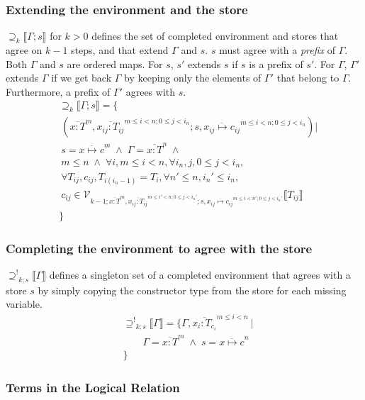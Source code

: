\documentclass[9pt]{sigplanconf}
\newcommand{\gap}{\quad\quad}
\newcommand{\seq}[1]{\overline{#1}}
\newcommand{\relv}[4]{\mathcal{V}_{#1;#2;#3}\llbracket#4\rrbracket}
\newcommand{\rels}[3]{\mathcal{\supseteq}_{#1}\llbracket#2;#3\rrbracket}
\newcommand{\relg}[3]{\mathcal{\supseteq^!}_{#1;#2}\llbracket#3\rrbracket}
\newcommand{\andl}{\;\wedge\;}
\begin{document}
\subsubsection{Extending the environment and the store}
$\rels k \Gamma s$ for $k > 0$ defines the set of completed
environment and stores that agree on $k-1$ steps, and that extend
$\Gamma$ and $s$. $s$ must agree with a {\it prefix} of $\Gamma$.
Both $\Gamma$ and $s$ are ordered maps. For $s$, $s'$ extends $s$ if
$s$ is a prefix of $s'$. For $\Gamma$, $\Gamma'$ extends $\Gamma$ if
we get back $\Gamma$ by keeping only the elements of $\Gamma'$ that
belong to $\Gamma$. Furthermore, a prefix of $\Gamma'$ agrees with
$s$.
\begin{align*}
&\rels k \Gamma s = \{\\
&\ (\seq{x : T}^m, \seq{x_{ij} : T_{ij}}^{m \leq i < n; 0 \leq j < i_n}; s, \seq{x_{ij} \mapsto c_{ij}}^{m \leq i < n; 0 \leq j < i_n}) |\\
&\ s = \seq{x \mapsto c}^m \andl \Gamma = \seq{x : T}^n \andl \\
&\ m\leq n \andl \forall i, m \leq i < n, \forall {i_n}, j, 0 \leq j < i_n,\\
&\ \forall T_{ij}, c_{ij}, T_{i{(i_n-1)}} = T_i, \forall n' \leq n, i_n' \leq i_n,\\
&\ c_{ij} \in \relv {k-1} {\seq{x : T}^m, \seq{x_{ij} : T_{ij}}^{m \leq i' < n; 0 \leq j < i_n'}} {s, \seq{x_{ij} \mapsto c_{ij}}^{m \leq i < n'; 0 \leq j < i_n'}} {T_{ij}}\\
&\}
\end{align*}

\subsubsection{Completing the environment to agree with the store}
$\relg k s \Gamma$ defines a singleton set of a completed environment
that agrees with a store $s$ by simply copying the constructor type
from the store for each missing variable.
\begin{align*}
&\relg k s \Gamma = \{ \Gamma, \seq{x_i : T_{c_i}}^{m \leq i < n} \ |\\
&\gap \Gamma = \seq{x : T}^m \andl s = \seq{x \mapsto c}^n\\
&\}
\end{align*}

\subsubsection{Terms in the Logical Relation}
\end{document}
